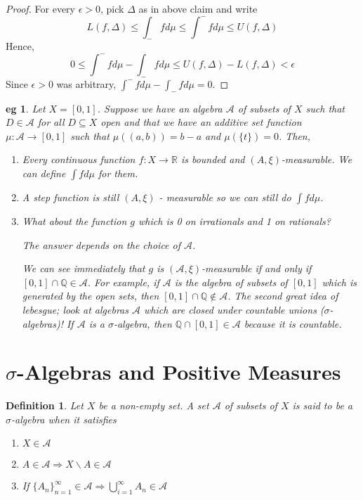 \documentclass[letterpaper, 12pt]{article}
\newcommand{\fin}{\qquad \quad \hfill \framebox[1.75mm][l]{\,}}
\newcommand{\bR}{\mathbb{R}}
\newcommand{\sA}{\mathcal{A}}
\theoremstyle{stdthm}
\theoremstyle{stddef}
\newtheorem{defn}[thm]{Definition}
\newtheorem{eg}[thm]{eg} %
\theoremstyle{stdnonum}
\theoremstyle{stdqands}
\theoremstyle{stdbold}
\begin{document}
\begin{proof}
For every $\epsilon >0$, pick $\Delta$ as in above claim and write 
\[L(f,\Delta) \leq \int_{-} fd\mu \leq \int^{-}f d\mu \leq U(f,\Delta) \]
Hence,
\[0 \leq \int^{-}f d\mu - \int_{-}f d\mu \leq U(f,\Delta) - L(f,\Delta) < \epsilon \]
Since $\epsilon >0$ was arbitrary, $\int^{-}fd\mu - \int_{-}fd\mu = 0$. 
\end{proof}

\begin{eg}
Let $X = [0,1]$. Suppose we have an algebra $\sA$ of subsets of $X$ such that $D \in \sA$ for all $D \subseteq X$ open and that we have an additive set function $\mu:\sA \rightarrow [0,1]$ such that $\mu((a,b)) = b-a$ and $\mu(\{t\}) =0$. Then,
\begin{enumerate}
\item Every continuous function $f:X\rightarrow \bR$ is bounded and $(A,\xi)$-measurable. We can define $\int fd\mu$ for them. 
\item A step function is still $(A,\xi)$ - measurable so we can still do $\int f d\mu$. 
\item What about the function $g$ which is 0 on irrationals and 1 on rationals? 

The answer depends on the choice of $\sA$. 

We can see immediately that $g$ is $(\sA,\xi)$-measurable if and only if $[0,1]\cap \mathbb{Q} \in \sA$. For example, if $\sA$ is the algebra of subsets of $[0,1]$ which is generated by the open sets, then $[0,1]\cap \mathbb{Q} \notin \sA$. The second great idea of lebesgue; look at algebras $\sA$ which are closed under countable unions ($\sigma$-algebras)! If $\sA$ is a $\sigma$-algebra, then $\mathbb{Q}\cap[0,1]\in \sA$ because it is countable. 
\end{enumerate}
\end{eg}

\newpage

\section{$\sigma$-Algebras and Positive Measures}

\begin{defn}
Let $X$ be a non-empty set. A set $\sA$ of subsets of $X$ is said to be a $\sigma$-algebra when it satisfies
\begin{enumerate}
\item $X \in \sA$
\item $A \in \sA \Rightarrow X\backslash A \in \sA$
\item If $\{A_n\}_{n=1}^\infty \in \sA \Rightarrow \bigcup_{i=1}^\infty A_n \in \sA$
\end{enumerate} 
\end{defn}
\end{document}
